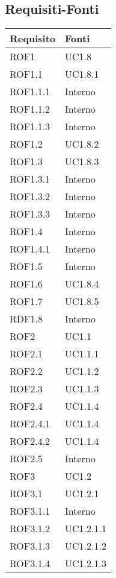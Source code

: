 \subsection{Requisiti-Fonti} %
\label{ssub:requisiti_fonti}
\begin{center}
\def\arraystretch{1.5}
\bgroup
\begin{longtable}{| p{4cm} | p{4cm} |}
\hline
\textbf{Requisito} & \textbf{Fonti} \\
\hline
ROF1   &  UC1.8 \\
\hline
ROF1.1   &  UC1.8.1 \\
\hline
ROF1.1.1   &  Interno \\
\hline
ROF1.1.2   &  Interno \\
\hline
ROF1.1.3   &  Interno \\
\hline
ROF1.2   &  UC1.8.2 \\
\hline
ROF1.3   &  UC1.8.3 \\
\hline
ROF1.3.1   &  Interno \\
\hline
ROF1.3.2   &  Interno \\
\hline
ROF1.3.3   &  Interno \\
\hline
ROF1.4   &  Interno \\
\hline
ROF1.4.1   &  Interno \\
\hline
ROF1.5   &  Interno \\
\hline
ROF1.6   &  UC1.8.4 \\
\hline
ROF1.7   &  UC1.8.5 \\
\hline
RDF1.8   &  Interno \\
\hline
ROF2   &  UC1.1 \\
\hline
ROF2.1   &  UC1.1.1 \\
\hline
ROF2.2   &  UC1.1.2 \\
\hline
ROF2.3   &  UC1.1.3 \\
\hline
ROF2.4   &  UC1.1.4 \\
\hline
ROF2.4.1   &  UC1.1.4 \\
\hline
ROF2.4.2   &  UC1.1.4 \\
\hline
ROF2.5   &  Interno  \\
\hline
ROF3   &  UC1.2 \\
\hline
ROF3.1   &  UC1.2.1 \\
\hline
ROF3.1.1   &  Interno \\
\hline
ROF3.1.2   &  UC1.2.1.1 \\
\hline
ROF3.1.3   &  UC1.2.1.2 \\
\hline
ROF3.1.4   &  UC1.2.1.3 \\
\hline

\end{longtable}
\end{center}
